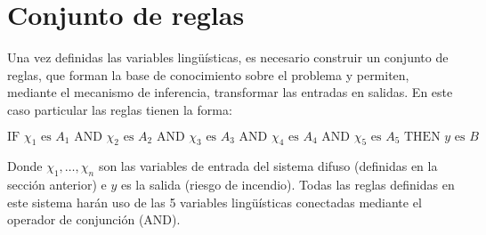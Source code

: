 \section{Conjunto de reglas}

Una vez definidas las variables lingüísticas, es necesario construir un conjunto de reglas, que forman la base de conocimiento sobre el problema y permiten, mediante el mecanismo de inferencia, transformar las entradas en salidas. En este caso particular las reglas tienen la forma:

\begin{equation}
\text{IF }\chi_1  \text{ es }A_1\text{ AND }\chi_2 \text{ es }A_2\text{ AND }\chi_3 \text{ es }A_3\text{ AND }\chi_4  \text{ es }A_4\text{ AND }\chi_5 \text{ es }A_5\text{ THEN }y\text{ es }B
\end{equation}

Donde $\chi_1,\ldots,\chi_n$ son las variables de entrada del sistema difuso (definidas en la sección anterior) e $y$ es la salida (riesgo de incendio). Todas las reglas definidas en este sistema harán uso de las 5 variables lingüísticas conectadas mediante el operador de conjunción (AND).

